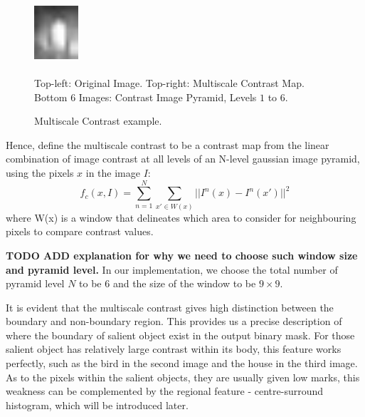 \documentclass[10pt,twocolumn,letterpaper]{article}
\newcommand{\SUM}{\sum\limits}
\newcommand{\BOLD}{\textbf}
\begin{document}
\begin{figure}[h]
\begin{center}
\includegraphics[width=0.65in,height=0.9in]{./Figures/pyramid/5_145_145839_p5.jpg} \hspace{1mm}\\
\caption{Multiscale Contrast example.}\small{Top-left: Original Image. Top-right: Multiscale Contrast Map.\\Bottom 6 Images: Contrast Image Pyramid, Levels $1$ to $6$.}
\end{center}
\end{figure}

Hence, define the multiscale contrast to be a contrast map from the linear combination of image contrast at all levels of an N-level
gaussian image pyramid, using the pixels $x$ in the image $I$: $$f_c(x,I) = \SUM_{n = 1}^{N}\SUM_{x'\in W(x)}||I^n(x)-I^n(x')||^2$$ where W(x) is a window that delineates which area to consider for neighbouring pixels to compare contrast values.

\BOLD{TODO ADD explanation for why we need to choose such window size and pyramid level.}
In our implementation, we choose the total number of pyramid level $N$ to be $6$ and the size of the window to be $9 \times 9$. 

It is evident that the multiscale contrast gives high distinction between the boundary and non-boundary region. This provides us a precise description of where the boundary of salient object exist in the output binary mask. For those salient object has relatively large contrast within its body, this feature works perfectly, such as the bird in the second image and the house in the third image. As to the pixels within the salient objects, they are usually given low marks, this weakness can be complemented by the regional feature - centre-surround histogram, which will be introduced later.
\end{document}
